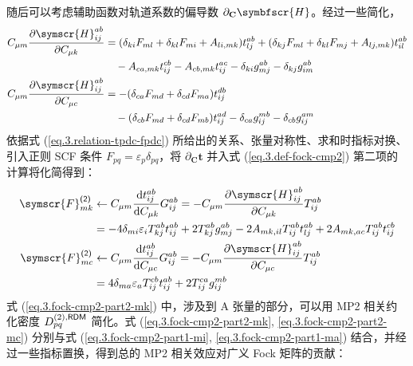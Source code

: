 随后可以考虑辅助函数对轨道系数的偏导数 $\partial_\mathbf{C} \symbfscr{H}$。经过一些简化，
\begin{subequations}
\begin{align}
    C_{\mu m} \frac{\partial \symscr{H}_{ij}^{ab}}{\partial C_{\mu k}} &= (\delta_{ki} F_{ml} + \delta_{kl} F_{mi} + A_{li, mk}) t_{lj}^{ab} + (\delta_{kj} F_{ml} + \delta_{kl} F_{mj} + A_{lj, mk}) t_{il}^{ab} \notag\\
    &\quad - A_{ca, mk} t_{ij}^{cb} - A_{cb, mk} t_{ij}^{ac} - \delta_{ki} g_{mj}^{ab} - \delta_{kj} g_{im}^{ab} \\
    C_{\mu m} \frac{\partial \symscr{H}_{ij}^{ab}}{\partial C_{\mu c}} &= - (\delta_{ca} F_{md} + \delta_{cd} F_{ma}) t_{ij}^{db} \notag\\
    &\quad - (\delta_{cb} F_{md} + \delta_{cd} F_{mb}) t_{ij}^{ad} - \delta_{ca} g_{ij}^{mb} - \delta_{cb} g_{ij}^{am}
\end{align}
\end{subequations}
依据式 (\ref{eq.3.relation-tpdc-fpdc}) 所给出的关系、张量对称性、求和时指标对换、引入正则 SCF 条件 $F_{pq} = \varepsilon_p \delta_{pq}$，将 $\partial_\mathbf{C} \mathbf{t}$ 并入式 (\ref{eq.3.def-fock-cmp2}) 第二项的计算将化简得到：
\begin{subequations}
\begin{align}
    \label{eq.3.fock-cmp2-part2-mk}
    \symscr{F}_{mk}^\textmt{(2)} &\leftarrow C_{\mu m} \frac{\mathrm{d} t_{ij}^{ab}}{\mathrm{d} C_{\mu k}} G_{ij}^{ab} = - C_{\mu m} \frac{\partial \symscr{H}_{ij}^{ab}}{\partial C_{\mu k}} T_{ij}^{ab} \notag\\
    &= - 4 \delta_{mi} \varepsilon_i T_{kj}^{ab} t_{ij}^{ab} + 2 T_{kj}^{ab} g_{mj}^{ab} - 2 A_{mk, il} T_{ij}^{ab} t_{lj}^{ab} + 2 A_{mk, ac} T_{ij}^{ab} t_{ij}^{cb} \\
    \label{eq.3.fock-cmp2-part2-mc}
    \symscr{F}_{mc}^\textmt{(2)} &\leftarrow C_{\mu m} \frac{\mathrm{d} t_{ij}^{ab}}{\mathrm{d} C_{\mu c}} G_{ij}^{ab} = - C_{\mu m} \frac{\partial \symscr{H}_{ij}^{ab}}{\partial C_{\mu c}} T_{ij}^{ab} \notag\\
    &= 4 \delta_{ma} \varepsilon_a T_{ij}^{cb} t_{ij}^{ab} + 2 T_{ij}^{ca} g_{ij}^{mb}
\end{align}
\end{subequations}
式 (\ref{eq.3.fock-cmp2-part2-mk}) 中，涉及到 A 张量的部分，可以用 MP2 相关约化密度 $D_{pq}^{(2),\textsf{RDM}}$ 简化。式 (\ref{eq.3.fock-cmp2-part2-mk}, \ref{eq.3.fock-cmp2-part2-mc}) 分别与式 (\ref{eq.3.fock-cmp2-part1-mi}, \ref{eq.3.fock-cmp2-part1-ma}) 结合，并经过一些指标置换，得到总的 MP2 相关效应对广义 Fock 矩阵的贡献：

